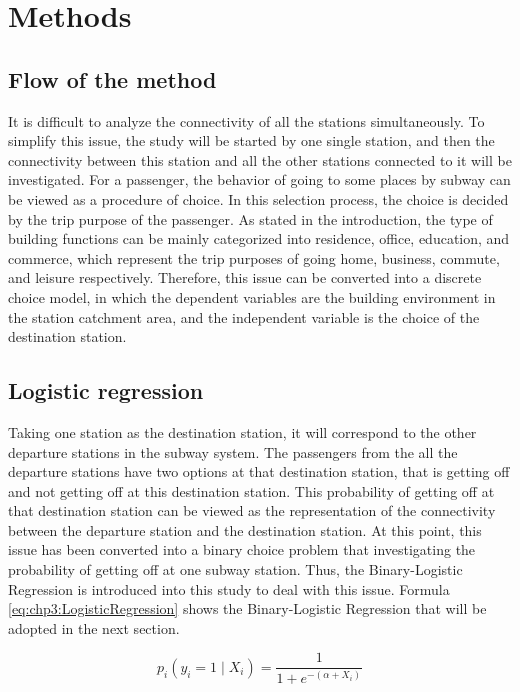 %
\section{Methods}
%
\subsection{Flow of the method}
It is difficult to analyze the connectivity of all the stations simultaneously. To simplify this issue, the study will be started by one single station, and then the connectivity between this station and all the other stations connected to it will be investigated. For a passenger, the behavior of going to some places by subway can be viewed as a procedure of choice. In this selection process, the choice is decided by the trip purpose of the passenger. As stated in the introduction, the type of building functions can be mainly categorized into residence, office, education, and commerce, which represent the trip purposes of going home, business, commute, and leisure respectively. Therefore, this issue can be converted into a discrete choice model, in which the dependent variables are the building environment in the station catchment area, and the independent variable is the choice of the destination station.

%
\subsection{Logistic regression}
Taking one station as the destination station, it will correspond to the other departure stations in the subway system. The passengers from the all the departure stations have two options at that destination station, that is getting off and not getting off at this destination station. This probability of getting off at that destination station can be viewed as the representation of the connectivity between the departure station and the destination station. At this point, this issue has been converted into a binary choice problem that investigating the probability of getting off at one subway station. Thus, the Binary-Logistic Regression is introduced into this study to deal with this issue. Formula \ref{eq:chp3:LogisticRegression} shows the Binary-Logistic Regression that will be adopted in the next section.

\begin{equation}
	p_i(y_i=1 \mid X_i)=\frac{1}{1+e^{-(\alpha +X_i)}}
	\label{eq:chp3:LogisticRegression}
\end{equation}

